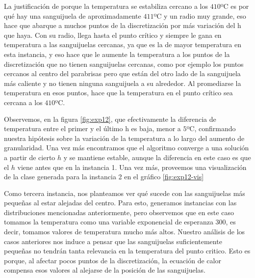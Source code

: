 La justificación de porque la temperatura se estabiliza cercano a los $410$ºC es por qué hay una sanguijuela de aproximadamente $411$ºC y un radio muy grande, eso hace que abarque a muchos puntos de la discretización por más variación del h que haya. Con su radio, llega hasta el punto crítico y siempre le gana en temperatura a las sanguijuelas cercanas, ya que es la de mayor temperatura en esta instancia, y eso hace que le aumente la temperatura a los puntos de la discretización que no tienen sanguijuelas cercanas, como por ejemplo los puntos cercanos al centro del parabrisas pero que están del otro lado de la sanguijuela más caliente y no tienen ninguna sanguijuela a su alrededor. Al promediarse la temperatura en esos puntos, hace que la temperatura en el punto crítico sea cercana a los $410$ºC.

Observemos, en la figura \ref{fig:exp12}, que efectivamente la diferencia de temperatura entre el primer y el último h es baja, menor a $5$ºC, confirmando nuestra hipótesis sobre la variación de la temperatura a lo largo del aumento de granularidad. Una vez más encontramos que el algoritmo converge a una solución a partir de cierto $h$ y se mantiene estable, aunque la diferencia en este caso es que el $h$ viene antes que en la instancia 1. Una vez más, proveemos una visualización de la clase generada para la instancia 2 en el gráfico \ref{fig:exp12-vis}

\pagebreak

Como tercera instancia, nos planteamos ver qué sucede con las sanguijuelas más pequeñas al estar alejadas del centro. Para esto, generamos instancias con las distribuciones mencionadas anteriormente, pero observemos que en este caso tomamos la temperatura como una variable exponencial de esperanza $300$, es decir, tomamos valores de temperatura mucho más altos. Nuestro análisis de los casos anteriores nos induce a pensar que las sanguijuelas suficientemente peque\~nas no tendrán tanta relevancia en la temperatura del punto critico. Esto es porque, al afectar pocos puntos de la discretizaci\'on, la ecuación de calor compensa esos valores al alejarse de la posición de las sanguijuelas. 

